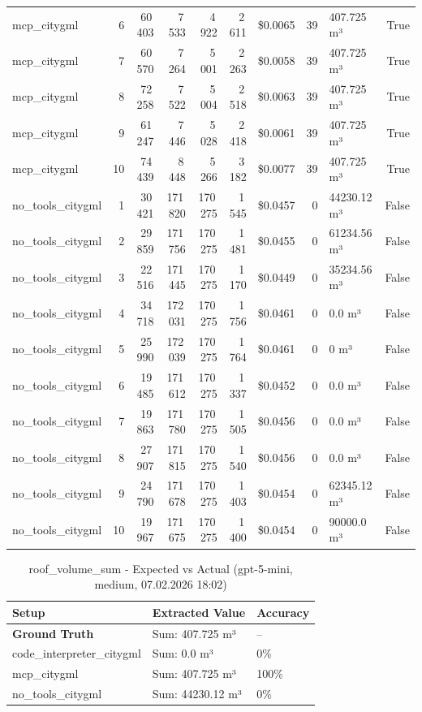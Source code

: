 \documentclass[a4paper,11pt]{article}
\begin{document}
\begin{table}[H]
{\begin{tabular}{l r r r r r r r l r}
mcp\_citygml & 6 & 60\,403 & 7\,533 & 4\,922 & 2\,611 & \$0.0065 & 39 & 407.725 m³ & True \\
mcp\_citygml & 7 & 60\,570 & 7\,264 & 5\,001 & 2\,263 & \$0.0058 & 39 & 407.725 m³ & True \\
mcp\_citygml & 8 & 72\,258 & 7\,522 & 5\,004 & 2\,518 & \$0.0063 & 39 & 407.725 m³ & True \\
mcp\_citygml & 9 & 61\,247 & 7\,446 & 5\,028 & 2\,418 & \$0.0061 & 39 & 407.725 m³ & True \\
mcp\_citygml & 10 & 74\,439 & 8\,448 & 5\,266 & 3\,182 & \$0.0077 & 39 & 407.725 m³ & True \\
\midrule
no\_tools\_citygml & 1 & 30\,421 & 171\,820 & 170\,275 & 1\,545 & \$0.0457 & 0 & 44230.12 m³ & False \\
no\_tools\_citygml & 2 & 29\,859 & 171\,756 & 170\,275 & 1\,481 & \$0.0455 & 0 & 61234.56 m³ & False \\
no\_tools\_citygml & 3 & 22\,516 & 171\,445 & 170\,275 & 1\,170 & \$0.0449 & 0 & 35234.56 m³ & False \\
no\_tools\_citygml & 4 & 34\,718 & 172\,031 & 170\,275 & 1\,756 & \$0.0461 & 0 & 0.0 m³ & False \\
no\_tools\_citygml & 5 & 25\,990 & 172\,039 & 170\,275 & 1\,764 & \$0.0461 & 0 & 0 m³ & False \\
no\_tools\_citygml & 6 & 19\,485 & 171\,612 & 170\,275 & 1\,337 & \$0.0452 & 0 & 0.0 m³ & False \\
no\_tools\_citygml & 7 & 19\,863 & 171\,780 & 170\,275 & 1\,505 & \$0.0456 & 0 & 0.0 m³ & False \\
no\_tools\_citygml & 8 & 27\,907 & 171\,815 & 170\,275 & 1\,540 & \$0.0456 & 0 & 0.0 m³ & False \\
no\_tools\_citygml & 9 & 24\,790 & 171\,678 & 170\,275 & 1\,403 & \$0.0454 & 0 & 62345.12 m³ & False \\
no\_tools\_citygml & 10 & 19\,967 & 171\,675 & 170\,275 & 1\,400 & \$0.0454 & 0 & 90000.0 m³ & False \\
\bottomrule
\end{tabular}}
\end{table}

\begin{table}[H]
\centering
\scriptsize
\caption{roof\_volume\_sum - Expected vs Actual (gpt-5-mini, medium, 07.02.2026 18:02)}
\begin{tabular}{l l l}
\toprule
Setup & Extracted Value & Accuracy \\
\midrule
\textbf{Ground Truth} & Sum: 407.725 m³ & -- \\
\midrule
code\_interpreter\_citygml & Sum: 0.0 m³ & 0\% \\
mcp\_citygml & Sum: 407.725 m³ & 100\% \\
no\_tools\_citygml & Sum: 44230.12 m³ & 0\% \\
\bottomrule
\end{tabular}
\end{table}
\end{document}

